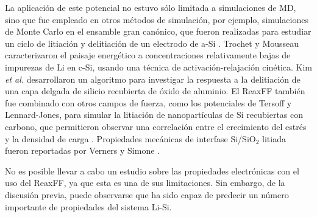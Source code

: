 La aplicación de este potencial no estuvo sólo limitada a simulaciones de MD, 
sino que fue empleado en otros métodos de simulación, por ejemplo, simulaciones 
de Monte Carlo en el ensamble gran canónico, que fueron realizadas para estudiar 
un ciclo de litiación y delitiación de un electrodo de a-Si \cite{basu2019}. 
Trochet y Mousseau \cite{trochet2017} caracterizaron el paisaje energético a 
concentraciones relativamente bajas de impurezas de Li en c-Si, usando una 
técnica de activación-relajación cinética. Kim \textit{et al.} \cite{kim2017} 
desarrollaron un algoritmo para investigar la respuesta a la delitiación de una 
capa delgada de silicio recubierta de óxido de aluminio. El ReaxFF también fue 
combinado con otros campos de fuerza, como los potenciales de Tersoff y 
Lennard-Jones, para simular la litiación de nanopartículas de Si recubiertas con 
carbono, que permitieron observar una correlación entre el crecimiento del 
estrés y la densidad de carga \cite{zheng2019,zheng2020}. Propiedades mecánicas 
de interfase Si/SiO$_2$ litiada fueron reportadas por Verners y 
Simone \cite{verners2019}. 

No es posible llevar a cabo un estudio sobre las propiedades electrónicas con el 
uso del ReaxFF, ya que esta es una de sus limitaciones. Sin embargo, de la 
discusión previa, puede observarse que ha sido capaz de predecir un número 
importante de propiedades del sistema Li-Si.
